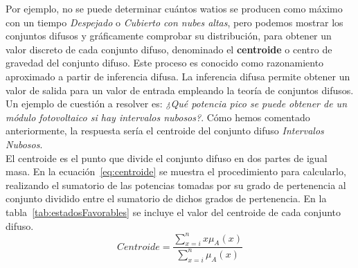 Por ejemplo, no se puede determinar cuántos watios se producen como máximo con un tiempo \textit{Despejado} o \textit{Cubierto con nubes altas}, pero podemos mostrar los conjuntos difusos y gráficamente comprobar su distribución, para obtener un valor discreto de cada conjunto difuso, denominado el \textbf{centroide} o centro de gravedad del conjunto difuso. Este proceso es conocido como razonamiento aproximado a partir de inferencia difusa. La inferencia difusa permite obtener un valor de salida para un valor de entrada empleando la teoría de conjuntos difusos.\\Un ejemplo de cuestión a resolver es: \textit{¿Qué potencia pico se puede obtener de un módulo fotovoltaico si hay intervalos nubosos?}. Cómo hemos comentado anteriormente, la respuesta sería el centroide del conjunto difuso \textit{Intervalos Nubosos}.\\El centroide es el punto que divide el conjunto difuso en dos partes de igual masa. En la ecuación~\ref{eq:centroide} se muestra el procedimiento para calcularlo, realizando el sumatorio de las potencias tomadas por su grado de pertenencia al conjunto dividido entre el sumatorio de dichos grados de pertenencia. En la tabla~\ref{tab:estadosFavorables} se incluye el valor del centroide de cada conjunto difuso.\\
\begin{equation}
        \label{eq:centroide}
        Centroide = \frac{\sum_{x=i}^{n} x \mu_{A}(x)}{\sum_{x=i}^{n} \mu_{A}(x)}
\end{equation}

